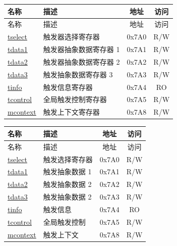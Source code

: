\begin{longtable}{ | p{4.0cm} | p{8.4cm} | c | c| }
\hline\rowcolor{lightgray}
名称 & 描述 & 地址 & 访问 \\ \hline
\endfirsthead
\hline
\rowcolor{lightgray}
名称 & 描述 & 地址 & 访问  \\
\hline
\endhead
\endfoot

\hyperref[regdesc:TSELECT]{tselect} & 触发器选择寄存器 & 0x7A0 & R/W \\\hline
\hyperref[regdesc:TDATA1]{tdata1} & 触发器抽象数据寄存器 1 & 0x7A1 & R/W \\\hline
\hyperref[regdesc:TDATA2]{tdata2} & 触发器抽象数据寄存器 2 & 0x7A2 & R/W \\\hline
\hyperref[regdesc:TDATA3]{tdata3} & 触发抽象数据寄存器 3 & 0x7A3 & R/W \\\hline
\hyperref[regdesc:TINFO]{tinfo} & 触发信息寄存器 & 0x7A4 & RO \\\hline
\hyperref[regdesc:TCONTROL]{tcontrol} & 全局触发控制寄存器 & 0x7A5 & R/W \\\hline
\hyperref[regdesc:MCONTEXT]{mcontext} & 触发上下文寄存器 & 0x7A8 & R/W \\\hline
\end{longtable}


\begin{longtable}{ | p{4.0cm} | p{8.4cm} | c | c| }
\hline\rowcolor{lightgray}
名称 & 描述 & 地址 & 访问 \\ \hline
\endfirsthead
\hline
\rowcolor{lightgray}
名称 & 描述 & 地址 & 访问  \\
\hline
\endhead
\endfoot
\hyperref[regdesc:TSELECT]{tselect} & 触发选择寄存器 & 0x7A0 & R/W \\\hline
\hyperref[regdesc:TDATA1]{tdata1} & 触发抽象数据 1 & 0x7A1 & R/W \\\hline
\hyperref[regdesc:TDATA2]{tdata2} & 触发抽象数据 2 & 0x7A2 & R/W \\\hline
\hyperref[regdesc:TDATA3]{tdata3} & 触发抽象数据 2 & 0x7A3 & R/W \\\hline
\hyperref[regdesc:TINFO]{tinfo} & 触发信息 & 0x7A4 & RO \\\hline
\hyperref[regdesc:TCONTROL]{tcontrol} & 全局触发控制 & 0x7A5 & R/W \\\hline
\hyperref[regdesc:MCONTEXT]{mcontext} & 触发上下文 & 0x7A8 & R/W \\\hline
\end{longtable}
